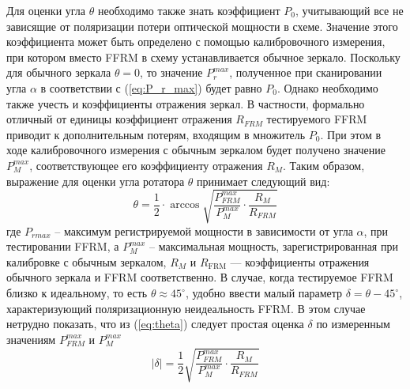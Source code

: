 \documentclass{article}
\begin{document}
Для оценки угла $\theta$ необходимо также знать коэффициент $P_0$, учитывающий все не зависящие от поляризации потери оптической мощности в схеме.
Значение этого коэффициента может быть определено с помощью калибровочного измерения, при котором вместо FFRM в схему устанавливается обычное зеркало.
Поскольку для обычного зеркала $\theta = 0$, то значение $P_r^{max}$, полученное при сканировании угла $\alpha$ в соответствии с (\ref{eq:P_r_max}) будет равно $P_0$.
Однако необходимо также учесть и коэффициенты отражения зеркал.
В частности, формально отличный от единицы коэффициент отражения $R_{FRM}$ тестируемого FFRM приводит к дополнительным потерям, входящим в множитель $P_0$.
При этом в ходе калибровочного измерения с обычным зеркалом будет получено значение $P_M^{max}$, соответствующее его коэффициенту отражения $R_M$.
Таким образом, выражение для оценки угла ротатора $\theta$ принимает следующий вид:
\begin{equation}
    \label{eq:theta}
    \theta =\frac{1}{2}\cdot\arccos\sqrt{\frac{P_{FRM}^{max}}{P_M^{max}}\cdot\frac{R_M}{R_{FRM}}}
\end{equation}
где $P_{rmax}$ – максимум регистрируемой мощности в зависимости от угла $\alpha$, при тестировании FFRM, а $P_M^{max}$ – максимальная мощность, зарегистрированная при калибровке с обычным зеркалом, $R_M$ и $R_{\text{FRM}}$ — коэффициенты отражения обычного зеркала и FFRM соответственно.
В случае, когда тестируемое FFRM близко к идеальному, то есть $\theta \approx 45^\circ$, удобно ввести малый параметр $\delta = \theta - 45^\circ$, характеризующий поляризационную неидеальность FFRM.
В этом случае нетрудно показать, что из (\ref{eq:theta}) следует простая оценка $\delta$ по измеренным значениям $P_{FRM}^{max}$ и $P_M^{max}$
\begin{equation}
    \label{eq:delta}
    |\delta| =\frac{1}{2}\sqrt{\frac{P_{FRM}^{max}}{P_M^{max}}\cdot\frac{R_M}{R_{FRM}}}
\end{equation}
\end{document}
